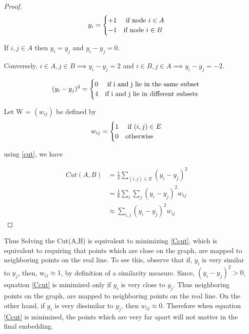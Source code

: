 \begin{proof}

\[
 y_{i} =
  \begin{cases} 
      \hfill +1    \hfill & \text{ if node $i \in A$} \\
      \hfill -1 \hfill & \text{if node $i \in B$} \\
  \end{cases}
\]

 If $i, j \in A $ then $y_{i} = y_{j}$ and $y_{i} - y_{j} = 0.$

 Conversely, $i \in A, j \in B \implies y_{i} - y_{j} = 2$ and $i \in B, j \in A \implies y_{i}-y_{j} = -2.$


\[
 (y_{i} - y_{j})^{2} =
  \begin{cases} 
      \hfill 0    \hfill & \text{ if i and j lie in the same subset} \\
      \hfill 4 \hfill & \text{if  i and j lie in different subsets } \\
  \end{cases}
\]

Let  W = $(w_{ij})$ be defined by
\[
 w_{ij} =
  \begin{cases} 
      \hfill 1   \hfill & \text{ if $ (i, j) \in E$} \\
      \hfill 0 \hfill & \text{otherwise} \\
  \end{cases}
\]

using \eqref{cut}, we have

\begin{align*}
Cut(A, B) &= \frac{1}{4} \sum_{(i, j) \in E} (y_{i} - y_{j})^{2}  \\
& =  \frac{1}{8} \sum_{i} \sum_{j} (y_{i}-y_{j})^{2}w_{ij} \\
& \approx  \sum_{i,j} (y_{i} - y_{j})^{2}w_{ij}
\end{align*}


\end{proof}
Thus
Solving the Cut(A,B) is equivalent to minimizing \eqref{Ccut},
which is equivalent to requiring that points which are close on the graph, are mapped to neighboring points on the real line.
To see this, observe that if, $y_{i}$ is very similar to $y_{j}$, then, w$_{ij} \approx 1$, by definition of a similarity measure. Since, $(y_{i}-y_{j})^2 > 0$, equation \eqref{Ccut} is minimized only if $y_{i}$ is very close to $y_{j}$. Thus neighboring points on the graph, are mapped to neighboring points on the real line. On the other hand, if $y_{i}$ is very dissimilar to $y_{j}$, then $w_{ij} \approx 0$. Therefore when equation  \eqref{Ccut} is minimized,
the points which are very far apart will not matter in the final embedding.

